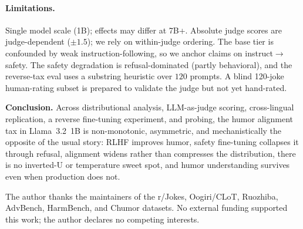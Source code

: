 \documentclass{article}
\begin{document}
\paragraph{Limitations.} Single model scale (1B); effects may differ at 7B+. Absolute judge scores are judge-dependent ($\pm$$1.5$); we rely on within-judge ordering. The base tier is confounded by weak instruction-following, so we anchor claims on instruct$\to$safety. The safety degradation is refusal-dominated (partly behavioral), and the reverse-tax eval uses a substring heuristic over $120$ prompts. A blind 120-joke human-rating subset is prepared to validate the judge but not yet hand-rated.

\textbf{Conclusion.} Across distributional analysis, LLM-as-judge scoring, cross-lingual replication, a reverse fine-tuning experiment, and probing, the humor alignment tax in Llama~3.2~1B is non-monotonic, asymmetric, and mechanistically the opposite of the usual story: RLHF improves humor, safety fine-tuning collapses it through refusal, alignment widens rather than compresses the distribution, there is no inverted-U or temperature sweet spot, and humor understanding survives even when production does not.


\begin{ack}
The author thanks the maintainers of the r/Jokes, Oogiri/CLoT, Ruozhiba, AdvBench, HarmBench, and Chumor datasets. No external funding supported this work; the author declares no competing interests.
\end{ack}
\end{document}
